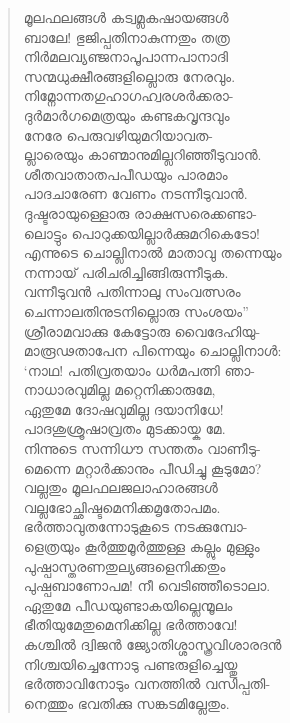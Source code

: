 \begin{verse}
മൂലഫലങ്ങള്‍ കട്വമ്ലകഷായങ്ങള്‍\\
ബാലേ! ഭുജിപ്പതിനാകുന്നതും തത്ര\\
നിര്‍മലവ്യഞ്ജനാപൂപാന്നപാനാദി\\
സന്മധുക്ഷീരങ്ങളില്ലൊരു നേരവും.\\
നിമ്നോന്നതഗുഹാഗഹ്വരശര്‍ക്കരാ-\\
ദുര്‍മാര്‍ഗമെത്രയും കണ്ടകവൃന്ദവും\\
നേരേ പെരുവഴിയുമറിയാവത-\\
ല്ലാരെയും കാണ്മാനുമില്ലറിഞ്ഞീടുവാന്‍.\\
ശീതവാതാതപപീഡയും പാരമാം\\
പാദചാരേണ വേണം നടന്നീടുവാന്‍.\\
ദുഷ്ടരായുള്ളൊരു രാക്ഷസരെക്കണ്ടാ-\\
ലൊട്ടും പൊറുക്കയില്ലാര്‍ക്കുമറികെടോ!\\
എന്നുടെ ചൊല്ലിനാല്‍ മാതാവു തന്നെയും\\
നന്നായ് പരിചരിച്ചിങ്ങിരുന്നീടുക.\\
വന്നീടുവന്‍ പതിന്നാലു സംവത്സരം\\
ചെന്നാലതിനുടനില്ലൊരു സംശയം”\\
ശ്രീരാമവാക്കു കേട്ടോരു വൈദേഹിയു-\\
മാരൂഢതാപേന പിന്നെയും ചൊല്ലിനാള്‍:\\
‘നാഥ! പതിവ്രതയാം ധര്‍മപത്നി ഞാ-\\
നാധാരവുമില്ല മറ്റെനിക്കാരുമേ,\\
ഏതുമേ ദോഷവുമില്ല ദയാനിധേ!\\
പാദശുശ്രൂഷാവ്രതം മുടക്കായ്ക മേ.\\
നിന്നുടെ സന്നിധൗ സന്തതം വാണീടു-\\
മെന്നെ മറ്റാര്‍ക്കാനും പീഡിച്ചു കൂടുമോ?\\
വല്ലതും മൂലഫലജലാഹാരങ്ങള്‍\\
വല്ലഭോച്ഛിഷ്ടമെനിക്കമൃതോപമം.\\
ഭര്‍ത്താവുതന്നോടുകൂടെ നടക്കുമ്പോ-\\
ളെത്രയും കൂര്‍ത്തുമൂര്‍ത്തുള്ള കല്ലും മുള്ളും\\
പുഷ്പാസ്തരണതുല്യങ്ങളെനിക്കതും\\
പുഷ്പബാണോപമ! നീ വെടിഞ്ഞീടൊലാ.\\
ഏതുമേ പീഡയുണ്ടാകയില്ലെന്മൂലം\\
ഭീതിയുമേതുമെനിക്കില്ല ഭര്‍ത്താവേ!\\
കശ്ചില്‍ ദ്വിജന്‍ ജ്യോതിശ്ശാസ്ത്രവിശാരദന്‍\\
നിശ്ചയിച്ചെന്നോടു പണ്ടരുളിച്ചെയ്തു\\
ഭര്‍ത്താവിനോടും വനത്തില്‍ വസിപ്പതി-\\
നെത്തും ഭവതിക്കു സങ്കടമില്ലേതും.\\

\end{verse}
